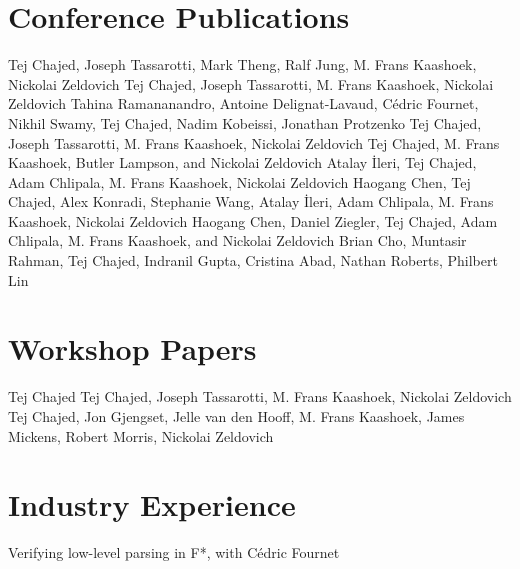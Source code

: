 \documentclass[11pt,a4paper,roman]{moderncv}   %
\begin{document}
\section{Conference Publications}
%
{Tej Chajed, Joseph Tassarotti, Mark Theng, Ralf Jung, M. Frans Kaashoek, Nickolai Zeldovich}
%
{Tej Chajed, Joseph Tassarotti, M. Frans Kaashoek, Nickolai Zeldovich}
%
{Tahina Ramananandro, Antoine Delignat-Lavaud, Cédric Fournet, Nikhil
Swamy, Tej Chajed, Nadim Kobeissi, Jonathan Protzenko}
%
{Tej Chajed, Joseph Tassarotti, M. Frans Kaashoek, Nickolai Zeldovich}
{Tej Chajed, M. Frans Kaashoek, Butler Lampson, and Nickolai Zeldovich}
%
{Atalay \.{I}leri, Tej Chajed, Adam Chlipala, M. Frans Kaashoek, Nickolai Zeldovich}
%
{Haogang Chen, Tej Chajed, Alex Konradi, Stephanie Wang, Atalay \.{I}leri, Adam Chlipala, M. Frans Kaashoek, Nickolai Zeldovich}
%
{Haogang Chen, Daniel Ziegler, Tej Chajed, Adam Chlipala, M. Frans Kaashoek, and Nickolai Zeldovich}
%
{Brian Cho, Muntasir Rahman, Tej Chajed, Indranil Gupta, Cristina Abad, Nathan Roberts, Philbert Lin}

\section{Workshop Papers}
%
{Tej Chajed}
%
{Tej Chajed, Joseph Tassarotti, M. Frans Kaashoek, Nickolai Zeldovich}
%
{Tej Chajed, Jon Gjengset, Jelle van den Hooff, M. Frans Kaashoek, James Mickens, Robert Morris, Nickolai Zeldovich}

\section{Industry Experience}
%
{Verifying low-level parsing in F*, with C\'edric Fournet}{}
\end{document}
